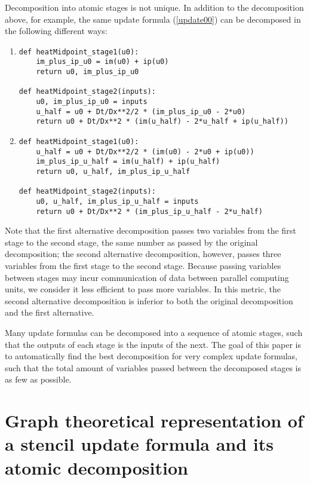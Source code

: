 \documentclass[review]{siamart0216}
\begin{document}
Decomposition into atomic stages is not unique.  In addition to
the decomposition above, for example, the same update formula (\ref{update00})
can be decomposed in the following different ways:
\begin{enumerate}
        \item
\begin{lstlisting}
def heatMidpoint_stage1(u0):
    im_plus_ip_u0 = im(u0) + ip(u0)
    return u0, im_plus_ip_u0

def heatMidpoint_stage2(inputs):
    u0, im_plus_ip_u0 = inputs
    u_half = u0 + Dt/Dx**2/2 * (im_plus_ip_u0 - 2*u0)
    return u0 + Dt/Dx**2 * (im(u_half) - 2*u_half + ip(u_half))
\end{lstlisting}

        \item
\begin{lstlisting}
def heatMidpoint_stage1(u0):
    u_half = u0 + Dt/Dx**2/2 * (im(u0) - 2*u0 + ip(u0))
    im_plus_ip_u_half = im(u_half) + ip(u_half)
    return u0, u_half, im_plus_ip_u_half

def heatMidpoint_stage2(inputs):
    u0, u_half, im_plus_ip_u_half = inputs
    return u0 + Dt/Dx**2 * (im_plus_ip_u_half - 2*u_half)
\end{lstlisting}
\end{enumerate}
Note that the first alternative decomposition passes two variables from the
first stage to the second stage, the same number as passed by the original
decomposition; the second alternative decomposition, however, passes three
variables from the first stage to the second stage.  Because passing
variables between stages may incur communication of data between parallel
computing units, we consider it less efficient to pass more variables.
In this metric, the second alternative decomposition is inferior to both
the original decomposition and the first alternative.

Many update formulas can be decomposed into a sequence of atomic stages,
such that the outputs of each stage is the inputs of the next.
The goal of this paper is to automatically find the best decomposition
for very complex update formulas, such that the total amount of variables
passed between the decomposed stages is as few as possible.


\section{Graph theoretical representation of a stencil update formula and its
atomic decomposition}
\end{document}
